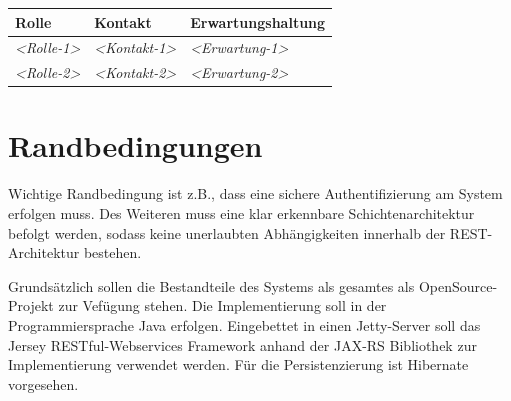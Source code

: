 \documentclass[]{article}
\begin{document}
\begin{longtable}[]{@{}lll@{}}
\toprule
\begin{minipage}[b]{0.23\columnwidth}\raggedright\strut
Rolle\strut
\end{minipage} & \begin{minipage}[b]{0.23\columnwidth}\raggedright\strut
Kontakt\strut
\end{minipage} & \begin{minipage}[b]{0.46\columnwidth}\raggedright\strut
Erwartungshaltung\strut
\end{minipage}\tabularnewline
\midrule
\endhead
\begin{minipage}[t]{0.23\columnwidth}\raggedright\strut
\emph{\textless{}Rolle-1\textgreater{}}\strut
\end{minipage} & \begin{minipage}[t]{0.23\columnwidth}\raggedright\strut
\emph{\textless{}Kontakt-1\textgreater{}}\strut
\end{minipage} & \begin{minipage}[t]{0.46\columnwidth}\raggedright\strut
\emph{\textless{}Erwartung-1\textgreater{}}\strut
\end{minipage}\tabularnewline
\begin{minipage}[t]{0.23\columnwidth}\raggedright\strut
\emph{\textless{}Rolle-2\textgreater{}}\strut
\end{minipage} & \begin{minipage}[t]{0.23\columnwidth}\raggedright\strut
\emph{\textless{}Kontakt-2\textgreater{}}\strut
\end{minipage} & \begin{minipage}[t]{0.46\columnwidth}\raggedright\strut
\emph{\textless{}Erwartung-2\textgreater{}}\strut
\end{minipage}\tabularnewline
\bottomrule
\end{longtable}

\section{Randbedingungen}\label{section-architecture-constraints}

Wichtige Randbedingung ist z.B., dass eine sichere Authentifizierung am System erfolgen muss. Des Weiteren muss eine klar erkennbare Schichtenarchitektur befolgt werden, sodass keine unerlaubten Abhängigkeiten innerhalb der REST-Architektur bestehen.

Grundsätzlich sollen die Bestandteile des Systems als gesamtes als OpenSource-Projekt zur Vefügung stehen. Die Implementierung soll in der Programmiersprache Java erfolgen. Eingebettet in einen Jetty-Server soll das Jersey RESTful-Webservices Framework anhand der JAX-RS Bibliothek zur Implementierung verwendet werden. 
Für die Persistenzierung ist Hibernate vorgesehen.
\end{document}
